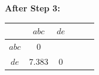 \documentclass[12pt]{article}
\begin{document}
\begin{enumerate}[label=(\alph*)]
\begin{center}
\begin{tabular}{c|ccccc}
    \end{tabular}
    \end{center}

    \textbf{After Step 3:}
    \begin{center}
    \begin{tabular}{c|ccccc}
          & $abc$ & $de$  \\ \hline
    $abc$ & 0     &       \\
    $de$  & 7.383 & 0     \\


    \end{tabular}
    \end{center}

\end{enumerate}
\end{document}
